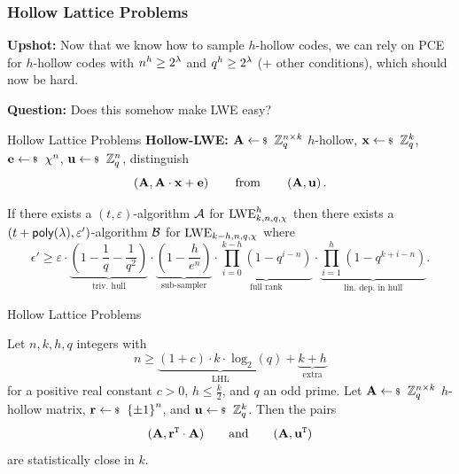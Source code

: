 \documentclass[xcolor=table,10pt,aspectratio=169]{beamer}
\begin{document}
\begin{frame}
  \frametitle{Hollow Lattice Problems}
  \textbf{Upshot:} Now that we know how to sample \(h\)-hollow codes, we can rely on PCE for \(h\)-hollow codes with \(n^h \geq 2^{\lambda}\) and \(q^h \geq 2^{\lambda}\) (+ other conditions), which should now be hard.

  \textbf{Question:} Does this somehow make LWE easy?
\end{frame}

\begin{frame}{Hollow Lattice Problems}
    \textbf{Hollow-LWE:} \(\mat{A} \sample \ZZ_q^{n\times k}\) \(h\)-hollow, \(\vec{x} \sample \ZZ_q^k\), \(\vec{e} \sample \chi^n\), \(\vec{u} \sample \ZZ_q^n\), distinguish
    \[
      \left( \mathbf{A}, \mathbf{A}\cdot\mathbf{x}+\mathbf{e} \right)
      \qquad\text{from}\qquad
      \left( \mathbf{A}, \mathbf{u} \right).
    \]
  \vfill
  \begin{theorem}
    If there exists a \((t,\varepsilon)\)-algorithm \(\mathcal{A}\) for \(\text{LWE}^h_{k,n,q,\chi}\) then there exists a \((t + \poly, \varepsilon')\)-algorithm \(\mathcal{B}\) for \(\text{LWE}_{k-h,n,q,\chi}\) where
    \[
      \epsilon'
      \geq \varepsilon
      \cdot \underbrace{\left( 1-\frac{1}{q}-\frac{1}{q^2} \right)}_\text{triv. hull}
      \cdot \underbrace{\left( 1 - \frac{h}{e^n} \right)}_\text{sub-sampler}
      \cdot \underbrace{\prod_{i=0}^{k-h} \left( 1 - q^{i-n} \right)}_\text{full rank}
      \cdot \underbrace{\prod_{i=1}^{h} \left( 1 - q^{k + i - n} \right)}_\text{lin. dep. in hull}.
    \]
  \end{theorem}
\end{frame}

\begin{frame}{Hollow Lattice Problems}
  \begin{theorem}
    Let \(n, k, h, q\) integers with
    \[
      n \geq \underbrace{(1+c) \cdot k \cdot \log_2(q)}_\text{LHL} + \underbrace{k + h}_\text{extra}
    \]
    for a positive real constant \(c > 0\), \(h \leq \frac{k}{2}\), and \(q\) an odd prime. Let \(\mat{A} \sample \ZZ_q^{n \times k}\) \(h\)-hollow matrix, \(\vec{r} \sample \set{\pm 1}^n\), and \(\mat{u} \sample \ZZ_q^k\). Then the pairs
    \[
      (\mathbf{A}, \mathbf{r}^{\mathtt{T}} \cdot \mathbf{A}) \qquad \text{and} \qquad (\mathbf{A}, \mathbf{u}^{\mathtt{T}})
    \]
    are statistically close in \(k\).
  \end{theorem}
\end{frame}
\end{document}

